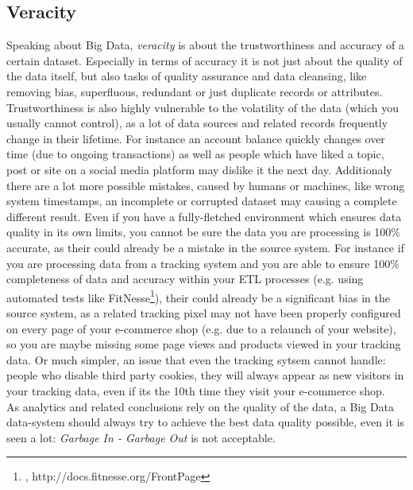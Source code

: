 \subsection{Veracity}
\label{bd_vs_veracity}
Speaking about Big Data, \textit{veracity} is about the trustworthiness and accuracy of a certain dataset. Especially in terms of accuracy it is not just about the quality of the data itself, but also tasks of quality assurance and data cleansing, like removing bias, superfluous, redundant or just duplicate records or attributes. Trustworthiness is also highly vulnerable to the volatility of the data (which you usually cannot control), as a lot of data sources and related records frequently change in their lifetime. For instance an account balance quickly changes over time (due to ongoing transactions) as well as people which have liked a topic, post or site on a social media platform may dislike it the next day. Additionaly there are a lot more possible mistakes, caused by humans or machines, like wrong system timestamps, an incomplete or corrupted dataset may causing a complete different result. Even if you have a fully-fletched environment which ensures data quality in its own limits, you cannot be sure the data you are processing is 100\% accurate, as their could already be a mistake in the source system. For instance if you are processing data from a tracking system and you are able to ensure 100\% completeness of data and accuracy within your ETL processes (e.g. using automated tests like FitNesse\footnote{\cite{FITNHP}, http://docs.fitnesse.org/FrontPage}), their could already be a significant bias in the source system, as a related tracking pixel may not have been properly configured on every page of your e-commerce shop (e.g. due to a relaunch of your website), so you are maybe missing some page views and products viewed in your tracking data. Or much simpler, an issue that even the tracking sytsem cannot handle: people who disable third party cookies, they will always appear as new visitors in your tracking data, even if its the 10th time they visit your e-commerce shop. \\
As analytics and related conclusions rely on the quality of the data, a Big Data data-system should always try to achieve the best data quality possible, even it is seen a lot: \textit{Garbage In - Garbage Out} is not acceptable.


